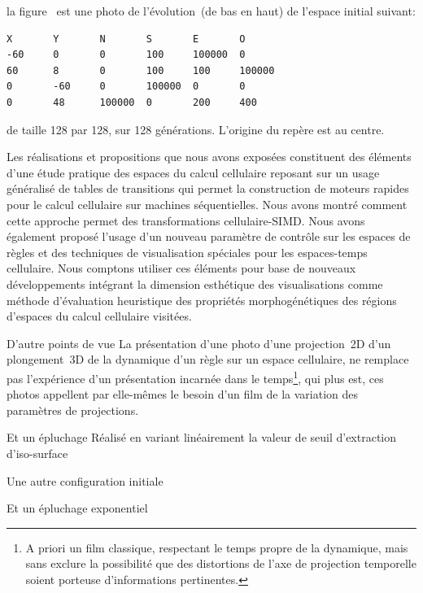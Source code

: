 la figure~ est une photo de l'\'evolution~(de bas en
haut) de l'espace initial suivant:

\footnotesize
\begin{verbatim}
X       Y       N       S       E       O
-60     0       0       100     100000  0
60      8       0       100     100     100000
0       -60     0       100000  0       0
0       48      100000  0       200     400
\end{verbatim}
\normalsize

de taille 128 par 128, sur 128 g\'en\'erations. %
L'origine du rep\`ere est au centre.

\vspace{4cm}
Les r\'ealisations et propositions que nous avons expos\'ees
constituent des \'el\'ements d'une \'etude pratique des espaces du calcul
cellulaire reposant sur un usage g\'en\'eralis\'e de tables de transitions
qui permet la construction de moteurs rapides pour le calcul
cellulaire sur machines s\'equentielles. %
Nous avons montr\'e comment cette approche permet des transformations
cellulaire-SIMD. %
Nous avons \'egalement propos\'e l'usage d'un nouveau param\`etre de contr\^ole
sur les espaces de r\`egles et des techniques de visualisation
sp\'eciales pour les espaces-temps cellulaire. %
Nous comptons utiliser ces \'el\'ements pour base de nouveaux
d\'eveloppements int\'egrant la dimension esth\'etique des visualisations
comme m\'ethode d'\'evaluation heuristique des propri\'et\'es morphog\'en\'etiques
des r\'egions d'espaces du calcul cellulaire visit\'ees.

%
{}%
{D'autre points de vue}%
{La pr\'esentation d'une photo d'une projection~2D d'un plongement~3D de la
  dynamique d'un r\`egle sur un espace cellulaire, ne remplace pas
  l'exp\'erience d'un pr\'esentation incarn\'ee dans le temps\footnote{%
    A priori un film classique, respectant le temps propre de la
    dynamique, mais sans exclure la possibilit\'e que des distortions de
    l'axe de projection temporelle soient porteuse d'informations
    pertinentes.}, %
  qui plus est, ces photos appellent par elle-m\^emes le besoin d'un
  film de la variation des param\`etres de projections.}

%
{}%
{Et un \'epluchage}%
{R\'ealis\'e en variant lin\'eairement la valeur de seuil d'extraction d'iso-sur\-face}

%
{}%
{Une autre configuration initiale}%
{}

%
{}%
{Et un \'epluchage exponentiel}%
{}

